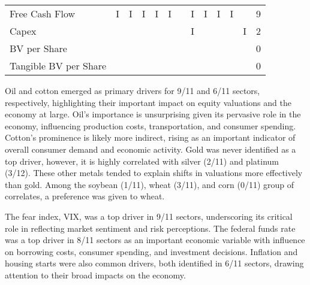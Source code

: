 \documentclass[12pt,a4paper,english]{article}
\begin{document}
\begin{table}[H]
\begin{minipage}{\textwidth}
{\begin{tabular}{@{}lrrrrrrrrrrr|r@{}}
				Free Cash Flow                                 & I                                 & I                             & I                               & I                                  & I &   & I & I & I & I &   & 9 \\
				Capex                                          &                                   &                               &                                 &                                    &   &   & I &   &   &   & I & 2 \\
				BV per Share                                   &                                   &                               &                                 &                                    &   &   &   &   &   &   &   & 0 \\
				Tangible BV per Share                          &                                   &                               &                                 &                                    &   &   &   &   &   &   &   & 0 \\ \bottomrule
			\end{tabular}%
		}
	\end{minipage}
\end{table}
\endgroup

Oil and cotton emerged as primary drivers for 9/11 and 6/11 sectors, respectively, highlighting their important impact on equity valuations and the economy at large. Oil's importance is unsurprising given its pervasive role in the economy, influencing production costs, transportation, and consumer spending. Cotton's prominence is likely more indirect, rising as an important indicator of overall consumer demand and economic activity. Gold was never identified as a top driver, however, it is highly correlated with silver (2/11) and platinum (3/12). These other metals tended to explain shifts in valuations more effectively than gold. Among the soybean (1/11), wheat (3/11), and corn (0/11) group of correlates, a preference was given to wheat.

The fear index, VIX, was a top driver in 9/11 sectors, underscoring its critical role in reflecting market sentiment and risk perceptions. The federal funds rate was a top driver in 8/11 sectors as an important economic variable with influence on borrowing costs, consumer spending, and investment decisions. Inflation and housing starts were also common drivers, both identified in 6/11 sectors, drawing attention to their broad impacts on the economy.
\end{document}
